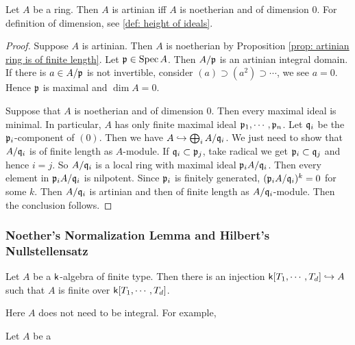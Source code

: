         \begin{proposition}\label{prop: artinian ring is of codimension 0}
            Let $A$ be a ring. 
            Then $A$ is artinian iff $A$ is noetherian and of dimension $0$.
            For definition of dimension, see \ref{def: height of ideals}.
        \end{proposition}
        \begin{proof}
            Suppose $A$ is artinian.
            Then $A$ is noetherian by Proposition \ref{prop: artinian ring is of finite length}.
            Let ${\mathfrak{p}} \in \operatorname{Spec} A$.
            Then $A/{\mathfrak{p}}$ is an artinian integral domain.
            If there is $a\in A/{\mathfrak{p}}$ is not invertible, consider $(a) \supset (a^2) \supset \cdots$, we see $a=0$.
            Hence ${\mathfrak{p}}$ is maximal and $\dim A = 0$. 

            Suppose that $A$ is noetherian and of dimension $0$.
            Then every maximal ideal is minimal.
            In particular, $A$ has only finite maximal ideal ${\mathfrak{p}}_1,\cdots,{\mathfrak{p}}_n$.
            Let ${\mathfrak{q}}_i$ be the ${\mathfrak{p}}_i$-component of $(0)$.
            Then we have $A \hookrightarrow \bigoplus_i A/{\mathfrak{q}}_i$.
            We just need to show that $A/{\mathfrak{q}}_i$ is of finite length as $A$-module.
            If ${\mathfrak{q}}_i \subset {\mathfrak{p}}_j$, take radical we get ${\mathfrak{p}}_i \subset {\mathfrak{q}}_j$ and hence $i=j$.
            So $A/{\mathfrak{q}}_i$ is a local ring with maximal ideal ${\mathfrak{p}}_i A/{\mathfrak{q}}_i$.
            Then every element in ${\mathfrak{p}}_i A/{\mathfrak{q}}_i$ is nilpotent.
            Since ${\mathfrak{p}}_i$ is finitely generated, $({\mathfrak{p}}_i A/{\mathfrak{q}}_i)^k = 0$ for some $k$.
            Then $A/{\mathfrak{q}}_i$ is artinian and then of finite length as $A/{\mathfrak{q}}_i$-module.
            Then the conclusion follows.
        \end{proof}


    \subsubsection{Noether's Normalization Lemma and Hilbert's Nullstellensatz }

        \begin{theorem}\label{thm: Noether's Normalization Lemma}
            Let $A$ be a ${\mathsf{k}}$-algebra of finite type.
            Then there is an injection ${\mathsf{k}}[T_1,\cdots,T_d] \hookrightarrow A$ such that $A$ is finite over ${\mathsf{k}}[T_1,\cdots,T_d]$.
        \end{theorem}

        \begin{remark}
            Here $A$ does not need to be integral. 
            For example, 
        \end{remark}

        \begin{theorem}\label{thm: Nullstellensatz}
            Let $A$ be a 
        \end{theorem}